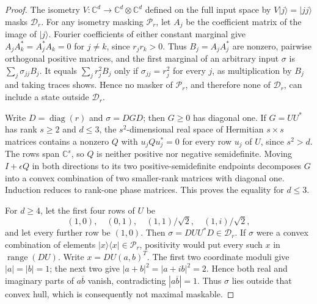 \documentclass[11pt]{article}
\newcommand{\C}{\mathbb C}
\newcommand{\diag}{\operatorname{diag}}
\begin{document}
\begin{proof}
The isometry $V:\C^d\to\C^d\otimes\C^d$ defined on the full input
space by $V|j\rangle=|jj\rangle$ masks $\mathcal D_r$.
For any isometry masking $\mathcal P_r$, let $A_j$
be the coefficient matrix of the image of $|j\rangle$.
Fourier coefficients of either constant marginal give
$A_jA_k^*=A_j^*A_k=0$ for $j\ne k$, since $r_jr_k>0$.
Thus $B_j=A_jA_j^*$ are nonzero, pairwise orthogonal positive matrices,
and the first marginal of an arbitrary input $\sigma$ is
$\sum_j\sigma_{jj}B_j$. It equals $\sum_jr_j^2B_j$ only if
$\sigma_{jj}=r_j^2$ for every $j$, as multiplication by $B_j$ and
taking traces shows. Hence no masker of $\mathcal P_r$, and therefore
none of $\mathcal D_r$, can include a state outside $\mathcal D_r$.

Write $D=\diag(r)$ and $\sigma=DGD$; then $G\ge0$ has diagonal one.
If $G=UU^*$ has rank $s\ge2$ and $d\le3$, the $s^2$-dimensional real
space of Hermitian $s\times s$ matrices contains a nonzero $Q$ with
$u_jQu_j^*=0$ for every row $u_j$ of $U$, since $s^2>d$.
The rows span $\C^s$, so $Q$ is neither positive nor negative
semidefinite. Moving $I+\epsilon Q$ in both directions to its two
positive-semidefinite endpoints decomposes $G$ into a convex combination
of two smaller-rank matrices with diagonal one. Induction reduces to
rank-one phase matrices. This proves the equality for $d\le3$.

For $d\ge4$, let the first four rows of $U$ be
\[
 (1,0),\quad(0,1),\quad(1,1)/\sqrt2,\quad(1,i)/\sqrt2,
\]
and let every further row be $(1,0)$. Then $\sigma=DUU^*D\in\mathcal D_r$.
If $\sigma$ were a convex combination of elements
$|x\rangle\langle x|\in\mathcal P_r$, positivity would put every such
$x$ in $\operatorname{range}(DU)$. Write $x=DU(a,b)^T$.
The first two coordinate moduli give $|a|=|b|=1$; the next two give
$|a+b|^2=|a+ib|^2=2$. Hence both real and imaginary parts of
$a\overline b$ vanish, contradicting $|a\overline b|=1$.
Thus $\sigma$ lies outside that convex hull, which is consequently
not maximal maskable.
\end{proof}
\end{document}
